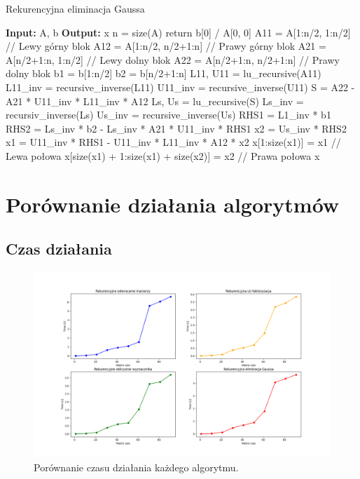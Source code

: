 \documentclass[11pt, leqno]{scrartcl}
\begin{document}
    \begin{algorithm}[H]
        \caption{Rekurencyjna eliminacja Gaussa}
        \begin{algorithmic}
            \State \textbf{Input:} A, b
            \State \textbf{Output:} x
                \State n = size(A)
                    \State return b[0] / A[0, 0]
                \EndIf
                \State
                \State A11 = A[1:n/2, 1:n/2]      // Lewy górny blok
                \State A12 = A[1:n/2, n/2+1:n]    // Prawy górny blok
                \State A21 = A[n/2+1:n, 1:n/2]    // Lewy dolny blok
                \State A22 = A[n/2+1:n, n/2+1:n]  // Prawy dolny blok
                \State b1 = b[1:n/2]
                \State b2 = b[n/2+1:n]
                \State
                \State L11, U11 = lu\_recursive(A11)
                \State L11\_inv = recursive\_inverse(L11)
                \State U11\_inv = recursive\_inverse(U11)
                \State S = A22 - A21 * U11\_inv * L11\_inv * A12
                \State Ls, Us = lu\_recursive(S)
                \State Ls\_inv = recursiv\_inverse(Ls)
                \State Us\_inv = recursive\_inverse(Us)
                \State
                \State RHS1 = L1\_inv * b1
                \State RHS2 = Ls\_inv * b2 -
                    Ls\_inv * A21 * U11\_inv * RHS1
                \State x2 = Us\_inv * RHS2
                \State x1 = U11\_inv * RHS1 -
                    U11\_inv * L11\_inv * A12 * x2
                    \State
                \State x[1:size(x1)] = x1     // Lewa połowa
                \State x[size(x1) + 1:size(x1) + size(x2)] = x2
                                              // Prawa połowa
                \State \Return x
            \EndFunction
        \end{algorithmic}
    \end{algorithm}

    \section{Porównanie działania algorytmów}
    \subsection{Czas działania}
    \begin{figure}[H]
        \centering
        \includegraphics[width=0.8\linewidth]{zad2_time.png}
        \caption{Porównanie czasu działania każdego algorytmu.}
    \end{figure}
\end{document}
